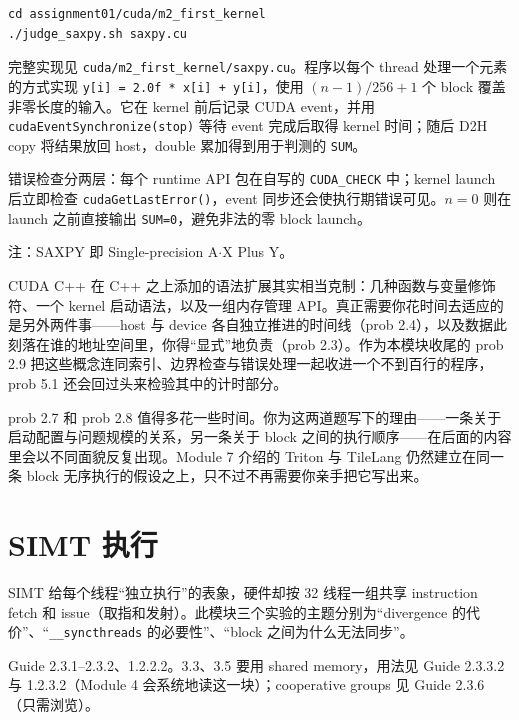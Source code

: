 \documentclass[11pt,a4paper,fontset=none]{ctexart}
\begin{document}
\begin{lstlisting}
cd assignment01/cuda/m2_first_kernel
./judge_saxpy.sh saxpy.cu
\end{lstlisting}

\begin{answer}
完整实现见 \texttt{cuda/m2\_first\_kernel/saxpy.cu}。程序以每个 thread 处理一个元素的方式实现 \texttt{y[i] = 2.0f * x[i] + y[i]}，使用 $(n - 1) / 256 + 1$ 个 block 覆盖非零长度的输入。它在 kernel 前后记录 CUDA event，并用 \texttt{cudaEventSynchronize(stop)} 等待 event 完成后取得 kernel 时间；随后 D2H copy 将结果放回 host，double 累加得到用于判测的 \texttt{SUM}。

错误检查分两层：每个 runtime API 包在自写的 \texttt{CUDA\_CHECK} 中；kernel launch 后立即检查 \texttt{cudaGetLastError()}，event 同步还会使执行期错误可见。$n=0$ 则在 launch 之前直接输出 \texttt{SUM=0}，避免非法的零 block launch。
\end{answer}

注：SAXPY 即 Single-precision A$\cdot$X Plus Y。

\begin{lookback}
CUDA C++ 在 C++ 之上添加的语法扩展其实相当克制：几种函数与变量修饰符、一个 kernel 启动语法，以及一组内存管理 API。真正需要你花时间去适应的是另外两件事——host 与 device 各自独立推进的时间线（prob 2.4），以及数据此刻落在谁的地址空间里，你得“显式”地负责（prob 2.3）。作为本模块收尾的 prob 2.9 把这些概念连同索引、边界检查与错误处理一起收进一个不到百行的程序，prob 5.1 还会回过头来检验其中的计时部分。

prob 2.7 和 prob 2.8 值得多花一些时间。你为这两道题写下的理由——一条关于启动配置与问题规模的关系，另一条关于 block 之间的执行顺序——在后面的内容里会以不同面貌反复出现。Module 7 介绍的 Triton 与 TileLang 仍然建立在同一条 block 无序执行的假设之上，只不过不再需要你亲手把它写出来。
\end{lookback}

\section{SIMT 执行}

SIMT 给每个线程“独立执行”的表象，硬件却按 32 线程一组共享 instruction fetch 和 issue（取指和发射）。此模块三个实验的主题分别为“divergence 的代价”、“\texttt{\_\_syncthreads} 的必要性”、“block 之间为什么无法同步”。

\begin{reading}
Guide 2.3.1--2.3.2、1.2.2.2。3.3、3.5 要用 shared memory，用法见 Guide 2.3.3.2 与 1.2.3.2（Module 4 会系统地读这一块）；cooperative groups 见 Guide 2.3.6（只需浏览）。
\end{reading}
\end{document}

